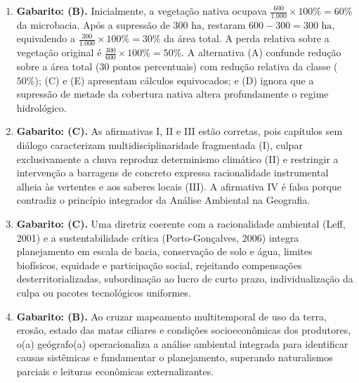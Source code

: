 \begin{boxGabarito}
\begin{enumerate}[leftmargin=1.8em, itemsep=4pt, start=11]
  \item \textbf{Gabarito: (B).} Inicialmente, a vegetação nativa ocupava $\frac{600}{1.000} \times 100\% = 60\%$ da microbacia. Após a supressão de $300\text{ ha}$, restaram $600 - 300 = 300\text{ ha}$, equivalendo a $\frac{300}{1.000} \times 100\% = 30\%$ da área total. A perda relativa sobre a vegetação original é $\frac{300}{600} \times 100\% = 50\%$. A alternativa (A) confunde redução sobre a área total ($30$ pontos percentuais) com redução relativa da classe ($50\%$); (C) e (E) apresentam cálculos equivocados; e (D) ignora que a supressão de metade da cobertura nativa altera profundamente o regime hidrológico.

  \item \textbf{Gabarito: (C).} As afirmativas I, II e III estão corretas, pois capítulos sem diálogo caracterizam multidisciplinaridade fragmentada (I), culpar exclusivamente a chuva reproduz determinismo climático (II) e restringir a intervenção a barragens de concreto expressa racionalidade instrumental alheia às vertentes e aos saberes locais (III). A afirmativa IV é falsa porque contradiz o princípio integrador da Análise Ambiental na Geografia.

  \item \textbf{Gabarito: (C).} Uma diretriz coerente com a racionalidade ambiental (Leff, 2001) e a sustentabilidade crítica (Porto-Gonçalves, 2006) integra planejamento em escala de bacia, conservação de solo e água, limites biofísicos, equidade e participação social, rejeitando compensações desterritorializadas, subordinação ao lucro de curto prazo, individualização da culpa ou pacotes tecnológicos uniformes.

  \item \textbf{Gabarito: (B).} Ao cruzar mapeamento multitemporal de uso da terra, erosão, estado das matas ciliares e condições socioeconômicas dos produtores, o(a) geógrafo(a) operacionaliza a análise ambiental integrada para identificar causas sistêmicas e fundamentar o planejamento, superando naturalismos parciais e leituras econômicas externalizantes.
\end{enumerate}
\end{boxGabarito}

